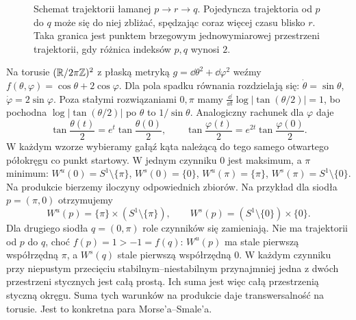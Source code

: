 \begin{figure}[H]
\centering
{}
\caption{Schemat trajektorii łamanej $p\to r\to q$.
Pojedyncza trajektoria od $p$ do $q$
może się do niej zbliżać, spędzając
coraz więcej czasu blisko $r$.
Taka granica jest punktem brzegowym
jednowymiarowej przestrzeni trajektorii,
gdy różnica indeksów $p,q$ wynosi $2$.}
\label{fig:lamane-trajektorie-morse-17}
\end{figure}

\begin{przyklad}
\label{prz:morse-smale-produkt-22}
Na torusie $(\mathbb{R}/2\pi\mathbb{Z})^2$ z płaską metryką
$g=\dd\theta^2+\dd\varphi^2$ weźmy
$f(\theta,\varphi)=\cos\theta+2\cos\varphi$.
Dla pola spadku równania rozdzielają się:
$\dot\theta=\sin\theta$, $\dot\varphi=2\sin\varphi$.
Poza stałymi rozwiązaniami $0,\pi$ mamy
$\frac{\dd}{\dd t}\log|\tan(\theta/2)|=1$,
bo pochodna $\log|\tan(\theta/2)|$ po $\theta$ to $1/\sin\theta$.
Analogiczny rachunek dla $\varphi$ daje
\[
 \tan\frac{\theta(t)}2=e^t\tan\frac{\theta(0)}2,\qquad
 \tan\frac{\varphi(t)}2=e^{2t}\tan\frac{\varphi(0)}2.
\]
W każdym wzorze wybieramy gałąź kąta należącą do tego
samego otwartego półokręgu co punkt startowy.
W jednym czynniku $0$ jest maksimum, a $\pi$ minimum:
$W^u(0)=S^1\setminus\{\pi\}$, $W^s(0)=\{0\}$,
$W^u(\pi)=\{\pi\}$, $W^s(\pi)=S^1\setminus\{0\}$.
Na produkcie bierzemy iloczyny odpowiednich zbiorów.
Na przykład dla siodła $p=(\pi,0)$ otrzymujemy
\[
 W^u(p)=\{\pi\}\times(S^1\setminus\{\pi\}),\qquad
 W^s(p)=(S^1\setminus\{0\})\times\{0\}.
\]
Dla drugiego siodła $q=(0,\pi)$ role czynników się zamieniają.
Nie ma trajektorii od $p$ do $q$, choć $f(p)=1>-1=f(q)$:
$W^u(p)$ ma stale pierwszą współrzędną $\pi$,
a $W^s(q)$ stale pierwszą współrzędną $0$.
W każdym czynniku przy niepustym przecięciu stabilnym--niestabilnym
przynajmniej jedna z dwóch przestrzeni stycznych jest całą prostą.
Ich suma jest więc całą przestrzenią styczną okręgu.
Suma tych warunków na produkcie daje transwersalność na torusie.
Jest to konkretna para Morse'a--Smale'a.
\end{przyklad}

